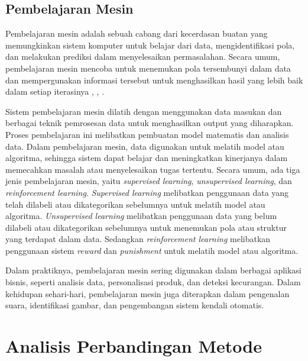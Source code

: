 \subsection{Pembelajaran Mesin}
Pembelajaran mesin adalah sebuah cabang dari kecerdasan buatan yang memungkinkan sistem komputer untuk belajar dari data, mengidentifikasi pola, dan melakukan prediksi dalam menyelesaikan permasalahan. Secara umum, pembelajaran mesin mencoba untuk menemukan pola tersembunyi dalam data dan mempergunakan informasi tersebut untuk menghasilkan hasil yang lebih baik dalam setiap iterasinya \cite{jordan2015machine}, \cite{Alpaydin2014}, \cite{murphy2012machine}.

Sistem pembelajaran mesin dilatih dengan menggunakan data masukan dan berbagai teknik pemrosesan data untuk menghasilkan output yang diharapkan. Proses pembelajaran ini melibatkan pembuatan model matematis dan analisis data. Dalam pembelajaran mesin, data digunakan untuk melatih model atau algoritma, sehingga sistem dapat belajar dan meningkatkan kinerjanya dalam memecahkan masalah atau menyelesaikan tugas tertentu. Secara umum, ada tiga jenis pembelajaran mesin, yaitu \emph{supervised learning}, \emph{unsupervised learning}, dan \emph{reinforcement learning}. \emph{Supervised learning} melibatkan penggunaan data yang telah dilabeli atau dikategorikan sebelumnya untuk melatih model atau algoritma. \emph{Unsupervised learning} melibatkan penggunaan data yang belum dilabeli atau dikategorikan sebelumnya untuk menemukan pola atau struktur yang terdapat dalam data. Sedangkan \emph{reinforcement learning} melibatkan penggunaan sistem \emph{reward} dan \emph{punishment} untuk melatih model atau algoritma.

Dalam praktiknya, pembelajaran mesin sering digunakan dalam berbagai aplikasi bisnis, seperti analisis data, personalisasi produk, dan deteksi kecurangan. Dalam kehidupan sehari-hari, pembelajaran mesin juga diterapkan dalam pengenalan suara, identifikasi gambar, dan pengembangan sistem kendali otomatis.



\section{Analisis Perbandingan Metode}